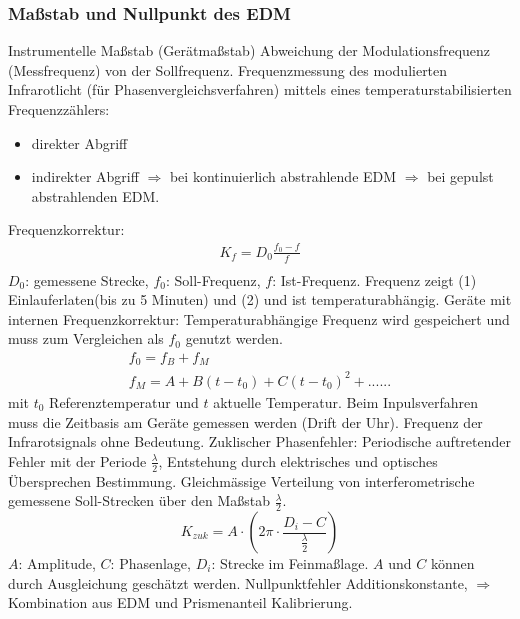 \documentclass[12pt]{article}
\begin{document}
\subsubsection{Maßstab und Nullpunkt des EDM}
Instrumentelle Maßstab (Gerätmaßstab)\newline
Abweichung der Modulationsfrequenz (Messfrequenz) von der Sollfrequenz. \newline
\newline
Frequenzmessung des modulierten Infrarotlicht (für Phasenvergleichsverfahren) mittels eines temperaturstabilisierten Frequenzzählers:
\begin{itemize}
	\item direkter Abgriff
	\item indirekter Abgriff $\Rightarrow$ bei kontinuierlich abstrahlende EDM $\Rightarrow$ bei gepulst abstrahlenden EDM.
\end{itemize}
Frequenzkorrektur:
\begin{gather*}
	K_f = D_0 \frac{f_0 - f}{f} \\
\end{gather*}
$D_0$: gemessene Strecke, $f_0$: Soll-Frequenz, $f$: Ist-Frequenz. Frequenz zeigt (1) Einlauferlaten(bis zu 5 Minuten) und (2) und ist temperaturabhängig. \newline
\newline
Geräte mit internen Frequenzkorrektur: \newline
Temperaturabhängige Frequenz wird gespeichert und muss zum Vergleichen als $f_0$ genutzt werden.
\begin{gather*}
	f_0 = f_B + f_M \\
	f_M = A + B(t - t_0) + C(t - t_0)^2 + ......
\end{gather*}
mit $t_0$ Referenztemperatur und $t$ aktuelle Temperatur.  \newline
\newline
Beim Inpulsverfahren muss die Zeitbasis am Geräte gemessen werden (Drift der Uhr). Frequenz der Infrarotsignals ohne Bedeutung. \newline
\newline
Zuklischer Phasenfehler:\newline
Periodische auftretender Fehler mit der Periode $\frac{\lambda}{2}$, Entstehung durch elektrisches und optisches Übersprechen Bestimmung. Gleichmässige Verteilung von interferometrische gemessene Soll-Strecken über den Maßstab $\frac{\lambda}{2}$.
\begin{equation*}
	K_{zuk} = A \cdot (2\pi \cdot \frac{D_i - C}{\frac{\lambda}{2}})
\end{equation*}
$A$: Amplitude, $C$: Phasenlage, $D_i$: Strecke im Feinmaßlage. $A$ und $C$ können durch Ausgleichung geschätzt werden. \newline
\newline
Nullpunktfehler Additionskonstante, $\Rightarrow$ Kombination aus EDM und Prismenanteil Kalibrierung. 
\end{document}
